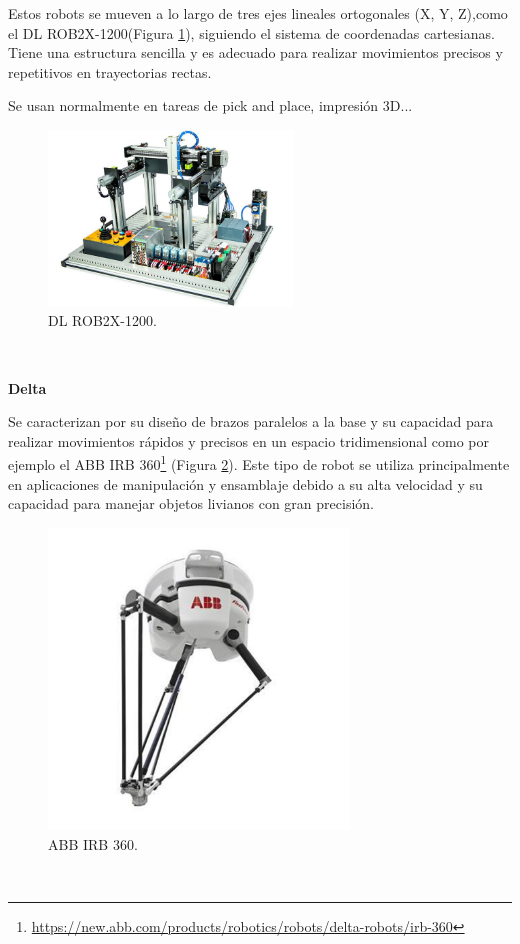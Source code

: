 Estos robots se mueven a lo largo de tres ejes lineales ortogonales (X, Y, Z),como el DL ROB2X-1200(Figura \ref{fig:cartesiano}), siguiendo el sistema de coordenadas cartesianas. Tiene una estructura sencilla y es adecuado para realizar movimientos precisos y repetitivos en trayectorias rectas.
 
Se usan normalmente en tareas de pick and place, impresión 3D...

\begin{figure} [h!]
  \begin{center}
    \includegraphics[width=6.5cm]{figs/cartesiano}
  \end{center}
  \caption{DL ROB2X-1200.}
  \label{fig:cartesiano}
\end{figure}\

\noindent\textbf{Delta} 




Se caracterizan por su diseño de brazos paralelos a la base y su capacidad para realizar movimientos rápidos y precisos en un espacio tridimensional como por ejemplo el ABB IRB 360\footnote{\url{https://new.abb.com/products/robotics/robots/delta-robots/irb-360}} (Figura \ref{fig:delta}). Este tipo de robot se utiliza principalmente en aplicaciones de manipulación y ensamblaje debido a su alta velocidad y su capacidad para manejar objetos livianos con gran precisión. 

\begin{figure} [h!]
  \begin{center}
    \includegraphics[width=8cm]{figs/delta}
  \end{center}
  \caption{ABB IRB 360.}
  \label{fig:delta}
\end{figure}\


